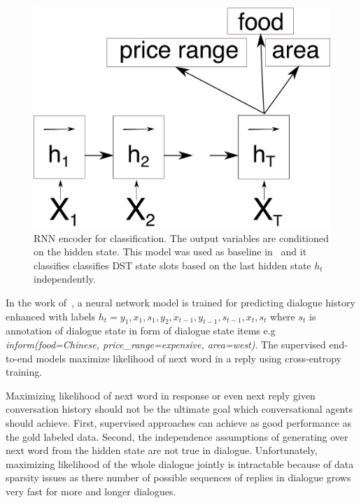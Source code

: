 \documentclass[11pt]{article}
\begin{document}
\begin{figure}[htpb]
    \centering
    \includegraphics[width=0.8\linewidth]{encoder}
    \caption{RNN encoder for classification. The output variables are conditioned on the hidden state. This model was used as baseline in~\cite{platek_recurrent_2016} and it classifies classifies DST state slots based on the last hidden state $h_t$ independently.}
    \label{fig:encoder}
\end{figure}

In the work of~\cite{wen_networkbased_2016}, a neural network model is trained for predicting dialogue history enhanced with labels $h_t = y_1, x_1, s_1, y_2, \dot x_{t-1}, y_{t-1}, s_{t-1}, x_t, s_t $ where $s_t$ is annotation of dialogue state in form of dialogue state items e.g {\it inform(food=Chinese, price\_range=expensive, area=west)}.
The supervised end-to-end models maximize likelihood of next word in a reply using cross-entropy training.


Maximizing likelihood of next word in response or even next reply given conversation history should not be the ultimate goal which conversational agents should achieve.
First, supervised approaches can achieve as good performance as the gold labeled data.
Second, the independence assumptions of generating over next word from the hidden state are not true in dialogue.
Unfortunately, maximizing likelihood of the whole dialogue jointly is intractable because of data sparsity issues as there number of possible sequences of replies in dialogue grows very fast for more and longer dialogues.
\end{document}
